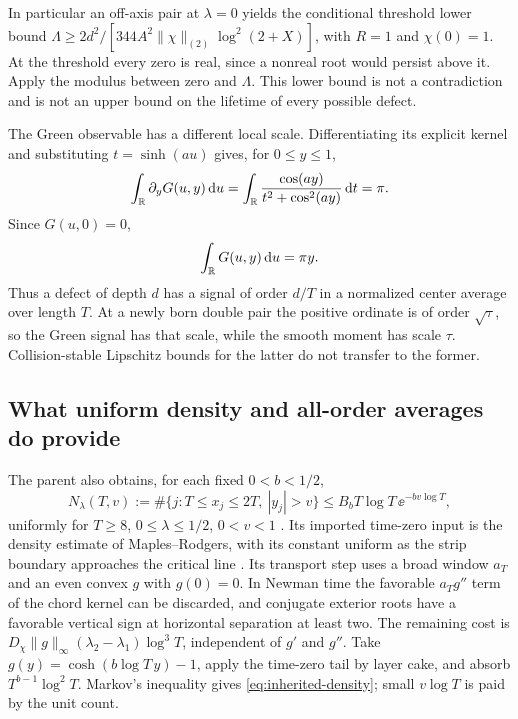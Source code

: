 In particular an off-axis pair at \(\lambda=0\) yields the conditional
threshold lower bound
\(\Lambda\ge2d^2/[344A^2\|\chi\|_{(2)}\log^2(2+X)]\), with
\(R=1\) and \(\chi(0)=1\). At the threshold every zero is real,
since a nonreal root would persist above it. Apply the modulus between
zero and \(\Lambda\). This lower bound is not a contradiction and is
not an upper bound on the lifetime of every possible defect.

The Green observable has a different local scale. Differentiating its
explicit kernel and substituting \(t=\sinh(au)\) gives, for \(0\le y\le1\),
\[
 \int_\mathbb R\partial_yG(u,y)\,\mathrm d u
 =\int_\mathbb R\frac{\cos(ay)}{t^2+\cos^2(ay)}\,\mathrm d t=\pi.
\]
Since \(G(u,0)=0\),
\begin{equation}\label{eq:Green-mass-depth}
 \int_\mathbb R G(u,y)\,\mathrm d u=\pi y.
\end{equation}
Thus a defect of depth \(d\) has a signal of order \(d/T\) in a
normalized center average over length \(T\). At a newly born double
pair the positive ordinate is of order \(\sqrt\tau\), so the Green
signal has that scale, while the smooth moment has scale \(\tau\).
Collision-stable Lipschitz bounds for the latter do not transfer to
the former.

\subsection{What uniform density and all-order averages do provide}
The parent also obtains, for each fixed \(0<b<1/2\),
\begin{equation}\label{eq:inherited-density}
 N_\lambda(T,v):=\#\{j:T\le x_j\le2T,\ |y_j|>v\}
 \le B_bT\log T\,\ee^{-bv\log T},
\end{equation}
uniformly for \(T\ge8\), \(0\le\lambda\le1/2\), \(0<v<1\)
\cite{SmoothLocalizationProof,SmoothLocalizationAssessment}.
Its imported time-zero input is the density estimate of
Maples--Rodgers, with its constant uniform as the strip boundary
approaches the critical line \cite[Theorem 2.4 and Section 4 (18)]{MaplesRodgers2015}.
Its transport step uses a broad window \(a_T\) and an even convex
\(g\) with \(g(0)=0\). In Newman time the favorable \(a_Tg''\)
term of the chord kernel can be discarded, and conjugate exterior
roots have a favorable vertical sign at horizontal separation at least
two. The remaining cost is
\(D_\chi\|g\|_\infty(\lambda_2-\lambda_1)\log^3T\), independent
of \(g'\) and \(g''\). Take \(g(y)=\cosh(b\log T\,y)-1\), apply
the time-zero tail by layer cake, and absorb
\(T^{b-1}\log^2T\). Markov's inequality gives
\eqref{eq:inherited-density}; small \(v\log T\) is paid by the unit count.

